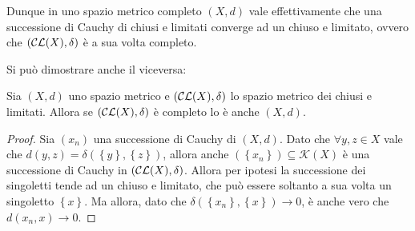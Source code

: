 Dunque in uno spazio metrico completo $\left (X,d\right )$ vale effettivamente che una successione di Cauchy di chiusi e limitati converge ad un chiuso e limitato, ovvero che $\left (\mathcal{CL}(X),\delta \right ) $ è a sua volta completo.


Si può dimostrare anche il viceversa:
\begin{theorem}
Sia  $\left (X,d\right )$ uno spazio metrico e $\left (\mathcal{CL}(X),\delta \right ) $ lo spazio metrico dei chiusi e limitati. Allora se $\left (\mathcal{CL}(X),\delta \right ) $ è completo lo è anche $\left (X,d\right )$.
\end{theorem}
\begin{proof}
Sia $\left( x_n \right)$ una successione di Cauchy di $\left (X,d\right )$. Dato che $\forall y,z \in X$ vale che $d\left( y,z\right)=\delta \left(\left \{y\right \},\left \{z \right \} \right)$, allora anche $\left(\left \{ x_n\right \} \right)\subseteq \mathcal{K}(X)$ è una successione di Cauchy in  $\left (\mathcal{CL}(X),\delta \right ) $. Allora per ipotesi la successione dei singoletti tende ad un chiuso e limitato, che può essere soltanto a sua volta un singoletto $\left \{x \right \}$. Ma allora, dato che $\delta \left ( \left \{ x_n\right \},\left \{x \right \} \right ) \to 0$, è anche vero che $d\left (  x_n,x  \right ) \to 0$.
\end{proof}
